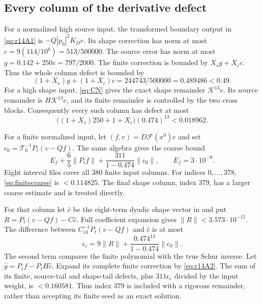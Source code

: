 \documentclass[11pt]{amsart}
\theoremstyle{remark}
\numberwithin{equation}{section}
\newcommand{\F}{\mathcal F}
\newcommand{\norm}[1]{\lVert#1\rVert}
\newcommand{\Pt}{P_t}
\begin{document}
\subsection{Every column of the derivative defect}
For a normalized high source input, the transformed boundary output in
\eqref{eq:r14A1} is $-Q|p_0|^2K_De$. Its shape correction has norm
at most $c=9(114/10^6)=513/500000$. The source error has norm at most
$g=0.142+250c=797/2000$. The finite correction is bounded by
$X_sg+X_cc$. Thus the whole column defect is bounded by
\begin{equation}\label{eq:r14highsource}
 (1+X_s)g+(1+X_c)c=244743/500000=0.489486<0.49.
\end{equation}
For a high shape input, \eqref{eq:CN} gives the exact shape remainder
$\mathcal K^{13}e$. Its source remainder is $H \mathcal K^{13}e$, and its finite remainder
is controlled by the two cross blocks. Consequently every such column
has defect at most
\begin{equation}\label{eq:r14highshape}
 \bigl((1+X_s)250+1+X_c\bigr)(0.474)^{13}<0.018962.
\end{equation}

For a finite normalized input, let $(f,v)=D\F(x^0)e$ and set
$c_0=\mathcal T_0^{-1}\Pt(v-Qf)$. The same algebra gives the coarse bound
\begin{equation}\label{eq:finitecoarse}
 E_f+\frac65\norm{\Pt f}
       +\frac{311}{1-0.474}\norm{c_0},\qquad E_f=3\cdot10^{-9}.
\end{equation}
Eight interval files cover all $380$ finite input columns.
For indices $0,\ldots,378$, \eqref{eq:finitecoarse} is $<0.114825$.
The final shape column, index $379$, has a larger coarse estimate and is
treated directly.

For that column let $\hat c$ be the eight-term dyadic shape vector in
 and put
$R=\Pt(v-Qf)-C\hat c$.
Full coefficient expansion gives $\norm R<3.573\cdot10^{-15}$.
The difference between $C_{13}^{-1}\Pt(v-Qf)$ and $\hat c$ is at most
\[
 \epsilon_c=9\norm R+
       \frac{0.474^{13}}{1-0.474}\norm{c_0}.
\]
The second term compares the finite polynomial with the true Schur
inverse. Let $\hat g=\Pt f-\Pt H\hat c$. Expand its complete finite
correction by \eqref{eq:r14A2}. The sum of its finite, source-tail and
shape-tail defects, plus $311\epsilon_c$ divided by the input weight,
is $<0.160581$. Thus index $379$ is included with a rigorous remainder,
rather than accepting its finite seed as an exact solution.
\end{document}

